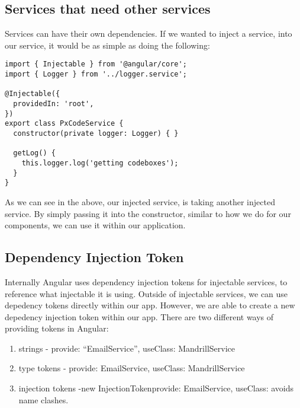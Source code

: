 \subsection{Services that need other services}
Services can have their own dependencies. If we wanted to inject a service, into
our service, it would be as simple as doing the following:
\begin{lstlisting}
import { Injectable } from '@angular/core';
import { Logger } from '../logger.service';

@Injectable({
  providedIn: 'root',
})
export class PxCodeService {
  constructor(private logger: Logger) { }

  getLog() {
    this.logger.log('getting codeboxes');
  }
}
\end{lstlisting}

As we can see in the above, our injected service, is taking another injected
service. By simply passing it into the constructor, similar to how we do for our
components, we can use it within our application.

\subsection{ Dependency Injection Token }
Internally Angular uses dependency injection tokens for injectable services, to
reference what injectable it is using. Outside of injectable services, we can
use depedency tokens directly within our app. However, we are able to create a
new depedency injection token within our app. There are two different ways of
providing tokens in Angular:
\begin{enumerate}
  \item strings - {provide: ``EmailService'', useClass: MandrillService}
  \item type tokens - {provide: EmailService, useClass: MandrillService}
  \item injection tokens -new InjectionToken{provide: EmailService, useClass:}
  avoids name clashes.
\end{enumerate}
